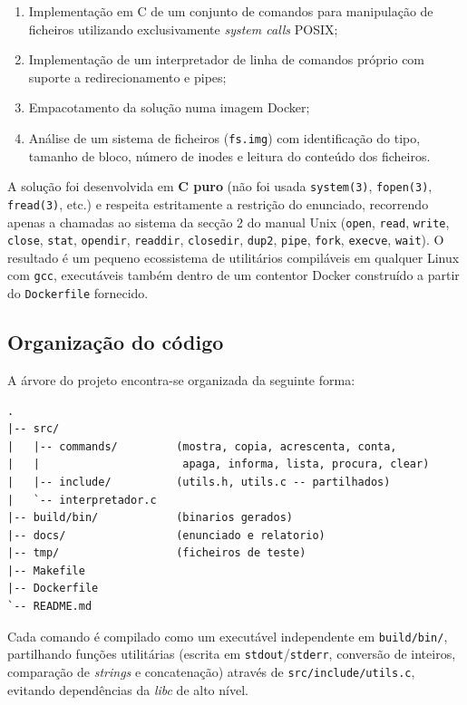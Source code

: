 \documentclass[11pt,a4paper]{article}
\begin{document}
\begin{enumerate}[leftmargin=2em]
    \item Implementação em C de um conjunto de comandos para manipulação de ficheiros utilizando exclusivamente \textit{system calls} POSIX;
    \item Implementação de um interpretador de linha de comandos próprio com suporte a redirecionamento e pipes;
    \item Empacotamento da solução numa imagem Docker;
    \item Análise de um sistema de ficheiros (\texttt{fs.img}) com identificação do tipo, tamanho de bloco, número de inodes e leitura do conteúdo dos ficheiros.
\end{enumerate}

A solução foi desenvolvida em \textbf{C puro} (não foi usada \texttt{system(3)}, \texttt{fopen(3)}, \texttt{fread(3)}, etc.) e respeita estritamente a restrição do enunciado, recorrendo apenas a chamadas ao sistema da secção 2 do manual Unix (\texttt{open}, \texttt{read}, \texttt{write}, \texttt{close}, \texttt{stat}, \texttt{opendir}, \texttt{readdir}, \texttt{closedir}, \texttt{dup2}, \texttt{pipe}, \texttt{fork}, \texttt{execve}, \texttt{wait}). O resultado é um pequeno ecossistema de utilitários compiláveis em qualquer Linux com \texttt{gcc}, executáveis também dentro de um contentor Docker construído a partir do \texttt{Dockerfile} fornecido.

\subsection{Organização do código}

A árvore do projeto encontra-se organizada da seguinte forma:

\begin{lstlisting}[style=shellstyle]
.
|-- src/
|   |-- commands/         (mostra, copia, acrescenta, conta,
|   |                      apaga, informa, lista, procura, clear)
|   |-- include/          (utils.h, utils.c -- partilhados)
|   `-- interpretador.c
|-- build/bin/            (binarios gerados)
|-- docs/                 (enunciado e relatorio)
|-- tmp/                  (ficheiros de teste)
|-- Makefile
|-- Dockerfile
`-- README.md
\end{lstlisting}

Cada comando é compilado como um executável independente em \texttt{build/bin/}, partilhando funções utilitárias (escrita em \texttt{stdout}/\texttt{stderr}, conversão de inteiros, comparação de \textit{strings} e concatenação) através de \texttt{src/include/utils.c}, evitando dependências da \textit{libc} de alto nível.
\end{document}
